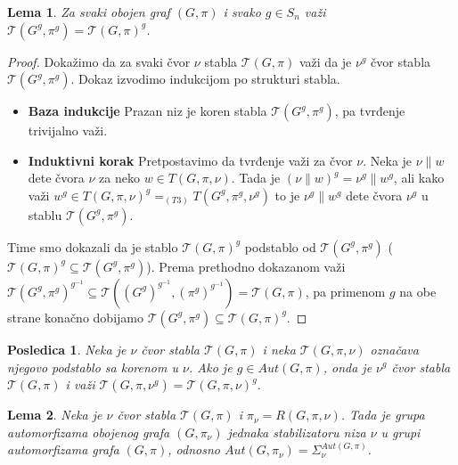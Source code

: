 \documentclass[12pt,oneside]{memoir}
\newtheorem{lemma}{Lema}
\newtheorem{corrolary}{Posledica}
\theoremstyle{definition}
\begin{document}
  \begin{lemma}
      Za svaki obojen graf $(G, \pi)$ i svako $g \in S_n$ važi
      $\mathcal{T}(G^g, \pi^g) = \mathcal{T}(G, \pi)^g$.
  \end{lemma}

  \begin{proof}
      Dokažimo da za svaki čvor $\nu$ stabla $\mathcal{T}(G, \pi)$ važi da je
      $\nu^g$ čvor stabla $\mathcal{T}(G^g, \pi^g)$. Dokaz izvodimo indukcijom
      po strukturi stabla.
      \begin{itemize}
     	 \item[] \textbf{Baza indukcije} Prazan niz je koren stabla
     		 $\mathcal{T}(G^g, \pi^g)$, pa tvrđenje trivijalno važi.
     	 \item[] \textbf{Induktivni korak} Pretpostavimo da tvrđenje važi za
     		 čvor $\nu$. Neka je $\nu \| w$ dete čvora $\nu$ za neko $w \in
     		 T(G, \pi, \nu)$. Tada je $(\nu \| w)^g = \nu^g \| w^g$, ali kako
     		 važi $w^g \in T(G, \pi, \nu)^g =_{(T3)} T(G^g, \pi^g, \nu^g)$
     		 to je $\nu^g \| w^g$ dete čvora $\nu^g$ u stablu $\mathcal{T}(G^g,
     		 \pi^g)$.
      \end{itemize}
	  Time smo dokazali da je stablo $\mathcal{T}(G, \pi)^g$ podstablo od
	  $\mathcal{T}(G^g, \pi^g)$ ($\mathcal{T}(G, \pi)^g \subseteq
	  \mathcal{T}(G^g, \pi^g)$). Prema prethodno dokazanom važi
	  $\mathcal{T}(G^g, \pi^g)^{g^{-1}} \subseteq \mathcal{T}((G^g)^{g^{-1}},
	  (\pi^g)^{g^{-1}}) = \mathcal{T}(G, \pi)$, pa primenom $g$ na obe strane
	  konačno dobijamo $\mathcal{T}(G^g, \pi^g) \subseteq \mathcal{T}(G,
	  \pi)^g$.
  \end{proof}

  \begin{corrolary}
	  \label{corr:auttree}
      Neka je $\nu$ čvor stabla $\mathcal{T}(G, \pi)$ i neka $\mathcal{T}(G,
      \pi, \nu)$ označava njegovo podstablo sa korenom u $\nu$. Ako je $g
      \in Aut(G, \pi)$, onda je $\nu^g$ čvor stabla $\mathcal{T}(G, \pi)$ i
      važi $\mathcal{T}(G, \pi, \nu^g) = \mathcal{T}(G, \pi, \nu)^g$.
  \end{corrolary}

  \begin{lemma}
	  Neka je $\nu$ čvor stabla $\mathcal{T}(G, \pi)$ i $\pi_\nu = R(G, \pi,
	  \nu)$. Tada je grupa automorfizama obojenog grafa $(G, \pi_\nu)$ jednaka
	  stabilizatoru niza $\nu$ u grupi automorfizama grafa $(G, \pi)$, odnosno
	  $Aut(G, \pi_\nu) = \Sigma_\nu^{Aut(G, \pi)}$.
  \end{lemma}
\end{document}

